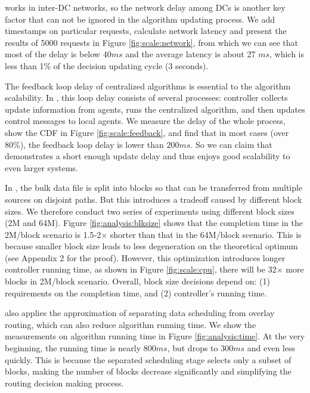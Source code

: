 \name works in inter-DC networks, so the network delay among DCs is another key factor that can not be ignored in the algorithm updating process. We add timestamps on particular requests, calculate network latency and present the results of 5000 requests in Figure \ref{fig:scale:network}, from which we can see that most of the delay is below $40ms$ and the average latency is about 27 $ms$, which is less than 1\% of the decision updating cycle (3 seconds).

 The feedback loop delay of centralized algorithms is essential to the algorithm scalability. In \name, this loop delay consists of several processes: controller collects update information from agents, runs the centralized algorithm, and then updates control messages to local agents. We measure the delay of the whole process, show the CDF in Figure \ref{fig:scale:feedback}, and find that in most cases (over 80\%), the feedback loop delay is lower than $200ms$. So we can claim that \name demonstrates a short enough update delay and thus enjoys good scalability to even larger systems.


 In \name, the bulk data file is split into blocks so that can be transferred from multiple sources on disjoint paths. But this introduces a tradeoff caused by different block sizes. We therefore conduct two series of experiments using different block sizes (2M and 64M). Figure \ref{fig:analysis:blksize} shows that the completion time in the 2M/block scenario is 1.5-2$\times$ shorter than that in the 64M/block scenario. This is because smaller block size leads to less degeneration on the theoretical optimum (see Appendix 2 for the proof). However, this optimization introduces longer controller running time, as shown in Figure \ref{fig:scale:cpu}, there will be 32$\times$ more blocks in 2M/block scenario. Overall, block size decisions depend on: (1) requirements on the completion time, and (2) controller's running time.

 \name also applies the approximation of separating data scheduling from overlay routing, which can also reduce algorithm running time. We show the measurements on algorithm running time in Figure \ref{fig:analysis:time}. At the very beginning, the running time is nearly $800ms$, but drops to $300ms$ and even less quickly. This is because the separated scheduling stage selects only a subset of blocks, making the number of blocks decrease significantly and simplifying the routing decision making process.

